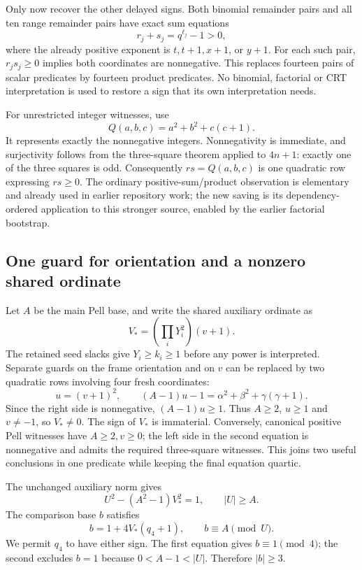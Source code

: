 Only now recover the other delayed signs.  Both binomial remainder pairs
and all ten range remainder pairs have exact sum equations
\[
 r_j+s_j=q^{\ell_j}-1>0,
\]
where the already positive exponent is $t,t+1,x+1$, or $y+1$.
For each such pair, $r_js_j\ge0$ implies both coordinates are nonnegative.
This replaces fourteen pairs of scalar predicates by fourteen product
predicates.  No binomial, factorial or CRT interpretation is used to
restore a sign that its own interpretation needs.

For unrestricted integer witnesses, use
\[
 Q(a,b,c)=a^2+b^2+c(c+1).
\]
It represents exactly the nonnegative integers.  Nonnegativity is
immediate, and surjectivity follows from the three-square theorem applied
to $4n+1$: exactly one of the three squares is odd.
Consequently $rs=Q(a,b,c)$ is one quadratic row expressing $rs\ge0$.
The ordinary positive-sum/product observation is elementary and already
used in earlier repository work; the new saving is its dependency-ordered
application to this stronger source, enabled by the earlier factorial
bootstrap.

\subsection{One guard for orientation and a nonzero shared ordinate}

Let $A$ be the main Pell base, and write the shared auxiliary ordinate as
\[
 V_* = \left(\prod_iY_i^2\right)(v+1).
\]
The retained seed slacks give $Y_i\ge k_i\ge1$ before any power is
interpreted.  Separate guards on the frame orientation and on $v$ can be
replaced by two quadratic rows involving four fresh coordinates:
\begin{equation}\label{eq:joint-anchor}
 u=(v+1)^2,\qquad
 (A-1)u-1=\alpha^2+\beta^2+\gamma(\gamma+1).
\end{equation}
Since the right side is nonnegative, $(A-1)u\ge1$.  Thus $A\ge2$,
$u\ge1$ and $v\ne-1$, so $V_*\ne0$.  The sign of $V_*$ is immaterial.
Conversely, canonical positive Pell witnesses have $A\ge2,v\ge0$;
the left side in the second equation is nonnegative and admits the required
three-square witnesses.  This joins two useful conclusions in one predicate
while keeping the final equation quartic.

The unchanged auxiliary norm gives
\[
 U^2-(A^2-1)V_*^2=1,\qquad |U|\ge A.
\]
The comparison base $b$ satisfies
\[
 b=1+4V_*(q_4+1),\qquad b\equiv A\pmod U.
\]
We permit $q_4$ to have either sign.  The first equation gives
$b\equiv1\pmod4$; the second excludes $b=1$ because
$0<A-1<|U|$.  Therefore $|b|\ge3$.

